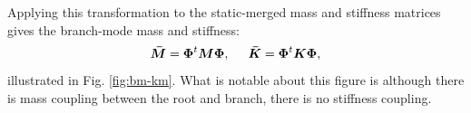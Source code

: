\documentclass[11pt,openany,twoside]{book}
\numberwithin{equation}{section}		%
\newcommand{\Matrix}[1]{\boldsymbol{#1}}
\newcommand{\Figref}[1]{Fig. \ref{#1}}  %
\begin{document}
Applying this transformation to the static-merged mass and stiffness
matrices gives the branch-mode mass and stiffness:
\begin{equation}
	\Matrix{\bar{M}} = \Matrix{\Phi}^t \Matrix{M} \Matrix{\Phi},\hspace{0.5cm}
	\Matrix{\bar{K}} = \Matrix{\Phi}^t \Matrix{K} \Matrix{\Phi},
\end{equation}
illustrated in \Figref{fig:bm-km}. What is notable about this figure is
although there is mass coupling between the root and branch, there
is no stiffness coupling.
\end{document}
